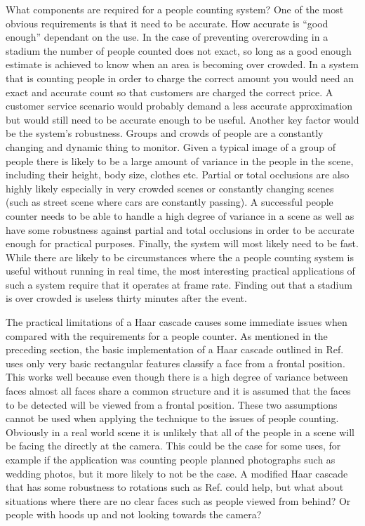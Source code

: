 \documentclass[conference]{IEEEtran}
\begin{document}
What components are required for a people counting system? One of the most obvious requirements is that it need to be accurate. How accurate is ``good enough'' dependant on the use. In the case of preventing overcrowding in a stadium the number of people counted does not exact, so long as a good enough estimate is achieved to know when an area is becoming over crowded. In a system that is counting people in order to charge the correct amount you would need an exact and accurate count so that customers are charged the correct price. A customer service scenario would probably demand a less accurate approximation but would still need to be accurate enough to be useful. Another key factor would be the system's robustness. Groups and crowds of people are a constantly changing and dynamic thing to monitor. Given a typical image of a group of people there is likely to be a large amount of variance in the people in the scene, including their height, body size, clothes etc. Partial or total occlusions are also highly likely especially in very crowded scenes or constantly changing scenes (such as street scene where cars are constantly passing). A successful people counter needs to be able to handle a high degree of variance in a scene as well as have some robustness against partial and total occlusions in order to be accurate enough for practical purposes. Finally, the system will most likely need to be fast. While there are likely to be circumstances where the a people counting system is useful without running in real time, the most interesting practical applications of such a system require that it operates at frame rate. Finding out that a stadium is over crowded is useless thirty minutes after the event.

The practical limitations of a Haar cascade causes some immediate issues when compared with the requirements for a people counter. As mentioned in the preceding section, the basic implementation of a Haar cascade outlined in Ref. \cite{viola2004robust} uses only very basic rectangular features classify a face from a frontal position. This works well because even though there is a high degree of variance between faces almost all faces share a common structure and it is assumed that the faces to be detected will be viewed from a frontal position. These two assumptions cannot be used when applying the technique to the issues of people counting. Obviously in a real world scene it is unlikely that all of the people in a scene will be facing the directly at the camera. This could be the case for some uses, for example if the application was counting people planned photographs such as wedding photos, but it more likely to not be the case. A modified Haar cascade that has some robustness to rotations such as Ref. \cite{jones2003fast} could help, but what about situations where there are no clear faces such as people viewed from behind? Or people with hoods up and not looking towards the camera?
\end{document}
